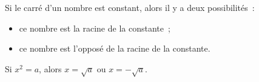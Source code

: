 Si le carré d'un nombre est constant, alors il y a deux possibilités~:
\begin{itemize}
    \item ce nombre est la racine de la constante~;
    \item ce nombre est l'opposé de la racine de la constante.
\end{itemize}
Si $x^2=a$, alors $x=\sqrt a$ ou $x=-\sqrt a$.